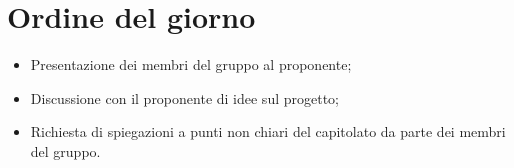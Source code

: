 \section{Ordine del giorno}
\begin{itemize}
\item Presentazione dei membri del gruppo al proponente;
\item Discussione con il proponente di idee sul progetto;
\item Richiesta di spiegazioni a punti non chiari del capitolato da parte dei membri del gruppo.
\end{itemize}